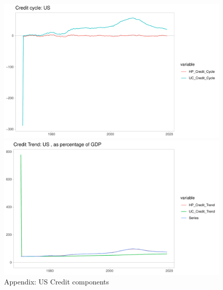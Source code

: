 \documentclass[fleqn]{article}
\begin{document}
\begin{outline}[enumerate]
\begin{figure}[h!]
	\caption{Appendix: US Credit components}	
	\centerline{\includegraphics[scale=0.7]{../../VAR_2_notempcovar/Output/Graphs/Credit_cycle_US.pdf}}
	\centerline{\includegraphics[scale=0.7]{../../VAR_2_notempcovar/Output/Graphs/Credit_trend_US.pdf}}
\end{figure}


\end{outline}
\end{document}
